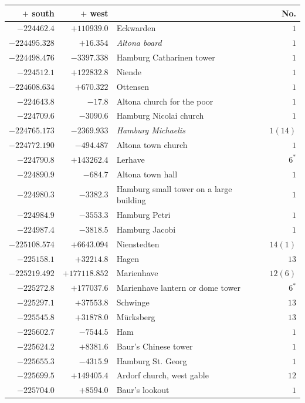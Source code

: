 \clearpage{}%
\begin{center}\begingroup\fontsize{8}{9}\selectfont
\setlength{\tabcolsep}{4pt}
\begin{tabular}{r|r|p{170pt}|r}\hline
\(+\) south&\(+\) west&&No.\\\hline
\(-224462.4\)&\(+110939.0\)&Eckwarden&\(1\)\\
\(-224495.328\)&\(+16.354\)&\textit{Altona board}&\(1\)\\
\(-224498.476\)&\(-3397.338\)&Hamburg Catharinen tower&\(1\)\\
\(-224512.1\)&\(+122832.8\)&Niende&\(1\)\\
\(-224608.634\)&\(+670.322\)&Ottensen&\(1\)\\
\(-224643.8\)&\(-17.8\)&Altona church for the poor&\(1\)\\
\(-224709.6\)&\(-3090.6\)&Hamburg Nicolai church&\(1\)\\
\(-224765.173\)&\(-2369.933\)&\textit{Hamburg Michaelis}&\(1(14)\)\\
\(-224772.190\)&\(-494.487\)&Altona town church&\(1\)\\
\(-224790.8\)&\(+143262.4\)&Lerhave&\(6^{*}\)\\
\(-224890.9\)&\(-684.7\)&Altona town hall&\(1\)\\
\(-224980.3\)&\(-3382.3\)&Hamburg small tower on a large building&\(1\)\\
\(-224984.9\)&\(-3553.3\)&Hamburg Petri&\(1\)\\
\(-224987.4\)&\(-3818.5\)&Hamburg Jacobi&\(1\)\\
\(-225108.574\)&\(+6643.094\)&Nienstedten&\(14(1)\)\\
\(-225158.1\)&\(+32214.8\)&Hagen&\(13\)\\
\(-225219.492\)&\(+177118.852\)&Marienhave&\(12(6)\)\\
\(-225272.8\)&\(+177037.6\)&Marienhave lantern or dome tower&\(6^{*}\)\\
\(-225297.1\)&\(+37553.8\)&Schwinge&\(13\)\\
\(-225545.8\)&\(+31878.0\)&Mürksberg&\(13\)\\
\(-225602.7\)&\(-7544.5\)&Ham&\(1\)\\
\(-225624.2\)&\(+8381.6\)&Baur’s Chinese tower&\(1\)\\
\(-225655.3\)&\(-4315.9\)&Hamburg St. Georg&\(1\)\\
\(-225699.5\)&\(+149405.4\)&Ardorf church, west gable&\(12\)\\
\(-225704.0\)&\(+8594.0\)&Baur’s lookout&\(1\)\\

\end{tabular}
\end{center}
